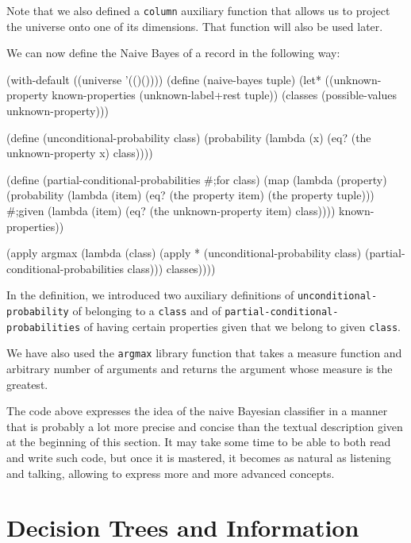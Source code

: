 Note that we also defined a \texttt{column} auxiliary function
that allows us to project the universe onto one of its dimensions.
That function will also be used later.

We can now define the Naive Bayes of a record in the following way:

\begin{Snippet}
(with-default ((universe '(()())))
  (define (naive-bayes tuple)
    (let* ((unknown-property known-properties 
			     (unknown-label+rest tuple))
	   (classes (possible-values unknown-property)))

      (define (unconditional-probability class)
        (probability (lambda (x) 
                        (eq? (the unknown-property x) class))))

      (define (partial-conditional-probabilities #;for class)
	(map (lambda (property)
               (probability 
                 (lambda (item)
		   (eq? (the property item) (the property tuple)))
		 #;given
		 (lambda (item)
		   (eq? (the unknown-property item) class))))
	      known-properties))

      (apply argmax (lambda (class)
                      (apply * (unconditional-probability class)
                               (partial-conditional-probabilities
                                class)))
              classes))))
\end{Snippet}

In the definition, we introduced two auxiliary definitions
of \texttt{unconditional\--probability} of belonging to a \texttt{class}
and of \texttt{partial\--conditional\--probabi\-lities} of having
certain properties given that we belong to given \texttt{class}.

We have also used the \texttt{argmax} library function that
takes a measure function and arbitrary number of arguments
and returns the argument whose measure is the greatest.

The code above expresses the idea of the naive Bayesian
classifier in a manner that is probably a lot more precise
and concise than the textual description given at the
beginning of this section. It may take some time to be able
to both read and write such code, but once it is mastered,
it becomes as natural as listening and talking, allowing to
express more and more advanced concepts.
\section{Decision Trees and Information}


